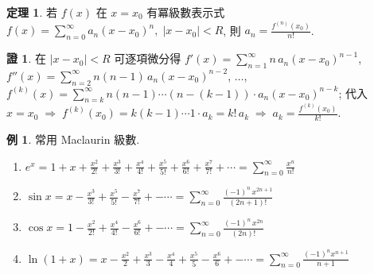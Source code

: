 \documentclass[12pt]{extarticle}
\newcommand{\ds}{\displaystyle}
\newcommand{\ie}{\;\Longrightarrow\;}
\theoremstyle{definition}
\newtheorem*{thm}{定理}
\newtheorem*{ex}{例}
\newtheorem*{prf}{證}
\begin{document}
\begin{thm}
  若 $f(x)$ 在 $x = x_0$ 有冪級數表示式 $\ds f(x) = \sum_{n = 0}^\infty a_n (x - x_0)^n,\;|x - x_0| < R$, 則 $\ds a_n = \frac{f^{(n)}(x_0)}{n!}$.  
\end{thm}

\begin{prf}
  在 $|x - x_0| < R$ 可逐項微分得 $\ds f'(x) = \sum_{n = 1}^\infty n\,a_n (x - x_0)^{n - 1}$, $\ds f''(x) = \sum_{n = 2}^\infty n(n - 1)\,a_n (x - x_0)^{n - 2}$, $\ds\ldots$, $\ds f^{(k)}(x) = \sum_{n = k}^\infty n(n - 1)\cdots(n - (k - 1))\cdot a_n (x - x_0)^{n - k}$; 代入 $\ds x = x_0 \ie f^{(k)}(x_0) = k(k - 1)\cdots 1\cdot a_k = k!\,a_k \ie a_k = \frac{f^{(k)}(x_0)}{k!}$. 
\end{prf}

\begin{ex} 常用 Maclaurin 級數. 
  \begin{enumerate}\setlength{\itemsep}{-1pt}
    \item $\ds e^x = 1 + x + \frac{x^2}{2!} + \frac{x^3}{3!} + \frac{x^4}{4!} + \frac{x^5}{5!} + \frac{x^6}{6!} + \frac{x^7}{7!} + \cdots = \sum_{n = 0}^\infty\frac{x^n}{n!}$
    \item $\ds\sin x = x - \frac{x^3}{3!} + \frac{x^5}{5!} - \frac{x^7}{7!} +- \cdots = \sum_{n = 0}^\infty\frac{(-1)^n\,x^{2n + 1}}{(2n + 1)!}$
    \item $\ds\cos x = 1 - \frac{x^2}{2!} + \frac{x^4}{4!} - \frac{x^6}{6!} +- \cdots = \sum_{n = 0}^\infty\frac{(-1)^n\,x^{2n}}{(2n)!}$
    \item $\ds\ln(1 + x) = x - \frac{x^2}{2} + \frac{x^3}{3} - \frac{x^4}{4} + \frac{x^5}{5} - \frac{x^6}{6} +- \cdots = \sum_{n = 0}^\infty\frac{(-1)^n x^{n + 1}}{n + 1}$
  \end{enumerate}
\end{ex}
\end{document}
